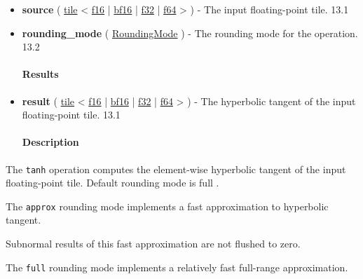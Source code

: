 \documentclass{article}
\begin{document}
\begin{itemize}
\item \textbf{source} ( \href{https://docs.nvidia.com/cuda/tile-ir/latest/sections/types.html#type-tile}{tile} < \href{https://docs.nvidia.com/cuda/tile-ir/latest/sections/types.html#subsection-element-types}{f16} | \href{https://docs.nvidia.com/cuda/tile-ir/latest/sections/types.html#subsection-element-types}{bf16} | \href{https://docs.nvidia.com/cuda/tile-ir/latest/sections/types.html#subsection-element-types}{f32} | \href{https://docs.nvidia.com/cuda/tile-ir/latest/sections/types.html#subsection-element-types}{f64} > ) - The input floating-point tile. 13.1
\item \textbf{rounding\_mode} ( \href{https://docs.nvidia.com/cuda/tile-ir/latest/sections/operations.html#op-attribute-cuda-tile-tanh-roundingmode-attr}{RoundingMode} ) - The rounding mode for the operation. 13.2


\paragraph{Results}

\item \textbf{result} ( \href{https://docs.nvidia.com/cuda/tile-ir/latest/sections/types.html#type-tile}{tile} < \href{https://docs.nvidia.com/cuda/tile-ir/latest/sections/types.html#subsection-element-types}{f16} | \href{https://docs.nvidia.com/cuda/tile-ir/latest/sections/types.html#subsection-element-types}{bf16} | \href{https://docs.nvidia.com/cuda/tile-ir/latest/sections/types.html#subsection-element-types}{f32} | \href{https://docs.nvidia.com/cuda/tile-ir/latest/sections/types.html#subsection-element-types}{f64} > ) - The hyperbolic tangent of the input floating-point tile. 13.1


\paragraph{Description}

\end{itemize}
The \texttt{tanh} operation computes the element-wise hyperbolic tangent of the input floating-point tile. Default rounding mode is full .


The \texttt{approx} rounding mode implements a fast approximation to hyperbolic tangent.

Subnormal results of this fast approximation are not flushed to zero.


The \texttt{full} rounding mode implements a relatively fast full-range approximation.
\end{document}
